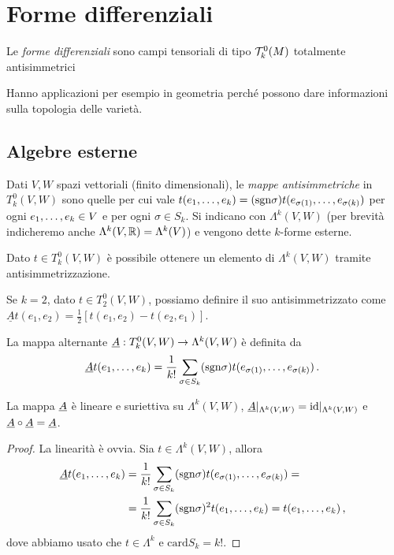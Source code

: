 \chapter{Forme differenziali} %

\begin{definition} 
	Le \emph{forme differenziali} sono campi tensoriali di tipo $\Tau_k^0(M)$ totalmente antisimmetrici
\end{definition}

Hanno applicazioni per esempio in geometria perché possono dare informazioni sulla topologia delle varietà.

\section{Algebre esterne}

\begin{definition}
 
Dati $V,W$ spazi vettoriali (finito dimensionali), le \emph{mappe antisimmetriche} in $T^0_k(V,W)$ sono quelle per cui vale $t(\seqb{e}{k}{,}) = (\sgn \sigma) t(e_{\sigma(1)},\ldots, e_{\sigma(k)})$ per ogni $\seqb{e}{k}{,} \in V$ e per ogni $\sigma\in S_k$.
Si indicano con $\Lambda^k(V,W)$ (per brevità indicheremo anche $\Lambda^k(V,\R) = \Lambda^k(V)$) e vengono dette $k$-forme esterne.

\end{definition}

Dato $t\in T^0_k(V,W)$ è possibile ottenere un elemento di $\Lambda^k(V,W)$ tramite antisimmetrizzazione. 
\begin{example}
	Se $k=2$, dato $t\in T^0_2(V,W)$, possiamo definire il suo antisimmetrizzato come $\underline{A}t(e_1,e_2) = \frac 12 [t(e_1,e_2) - t(e_2,e_1)]$.
\end{example}

\begin{definition}
	La mappa alternante $\antisimm:T^0_k(V,W) \to \Lambda^k(V,W)$ è definita da
	\begin{equation*}
		\antisimm t(\seqb{e}{k}{,}) = \frac 1 {k!} \sum_{\sigma \in S_k} (\sgn \sigma) t(e_{\sigma(1)},\ldots, e_{\sigma(k)}) \punto
	\end{equation*}
\end{definition}

\begin{proposition}
	La mappa $\antisimm$ è lineare e suriettiva su $\Lambda^k(V,W)$, $\antisimm\restrict{\Lambda^k(V,W)} = \id\restrict{\Lambda^k(V,W)}$ e $\antisimm \circ \antisimm = \antisimm$.
\end{proposition}
\begin{proof}
	La linearità è ovvia. Sia $t\in\Lambda^k(V,W)$, allora
	\begin{align*}
		\antisimm t(\seqb{e}{k}{,}) &= \frac 1 {k!} \sum_{\sigma \in S_k} (\sgn \sigma) t(e_{\sigma(1)},\ldots, e_{\sigma(k)}) =\\
		& = \frac 1 {k!} \sum_{\sigma \in S_k} (\sgn \sigma)^2 t(\seqb{e}{k}{,}) = t (\seqb{e}{k}{,}) \virgola
	\end{align*}
	dove abbiamo usato che $t\in\Lambda^k$ e $\mathrm{card} S_k = k!$.
\end{proof}

